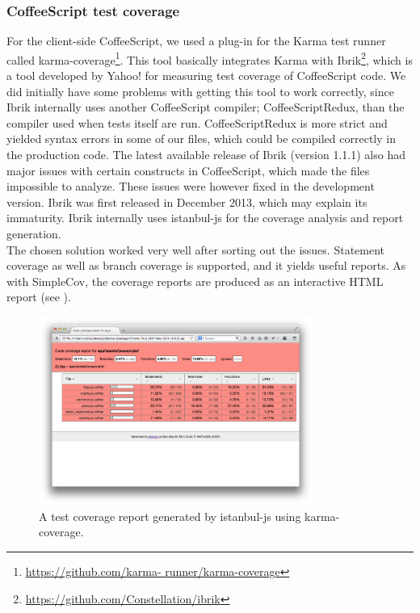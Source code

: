 \subsubsection{CoffeeScript test coverage}
For the client-side CoffeeScript, we used a plug-in for the Karma test
runner called karma-coverage\footnote{\url{https://github.com/karma-
runner/karma-coverage}}. This tool basically integrates Karma with
Ibrik\footnote{\url{https://github.com/Constellation/ibrik}}, which is a
tool developed by Yahoo! for measuring test coverage of CoffeeScript
code. We did initially have some problems with getting this tool to work
correctly, since Ibrik internally uses another CoffeeScript compiler;
CoffeeScriptRedux, than the compiler used when tests itself are run.
CoffeeScriptRedux is more strict and yielded syntax errors in some of
our files, which could be compiled correctly in the production code. The
latest available release of Ibrik (version 1.1.1) also had major issues
with certain constructs in CoffeeScript, which made the files impossible
to analyze. These issues were however fixed in the development version.
Ibrik was first released in December 2013, which may explain its
immaturity. Ibrik internally uses istanbul-js for the coverage
analysis and report generation.\\

The chosen solution worked very well after sorting out the issues.
Statement coverage as well as branch coverage is supported, and it
yields useful reports. As with SimpleCov, the coverage reports are
produced as an interactive HTML report (see ).\\

\begin{figure}
\centering
\includegraphics[width=0.8\textwidth]{results/choices/karma_coverage}
\caption{A test coverage report generated by istanbul-js using karma-coverage.}
\label{fig:karma_report}
\end{figure}


